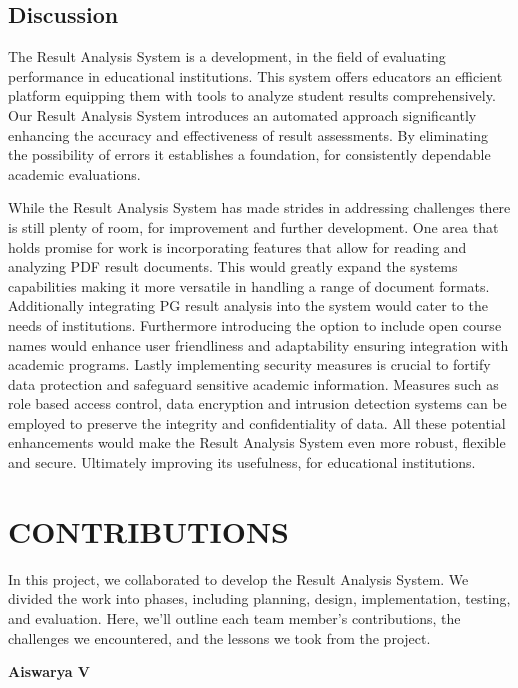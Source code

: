 \documentclass{nascproject}
\begin{document}
\section{Discussion}
The Result Analysis System is a development, in the field of evaluating performance in educational institutions. This system offers educators an efficient platform equipping them with tools to analyze student results comprehensively. Our Result Analysis System introduces an automated approach significantly enhancing the accuracy and effectiveness of result assessments. By eliminating the possibility of errors it establishes a foundation, for consistently dependable academic evaluations.

While the Result Analysis System has made strides in addressing challenges there is still plenty of room, for improvement and further development. One area that holds promise for work is incorporating features that allow for reading and analyzing PDF result documents. This would greatly expand the systems capabilities making it more versatile in handling a range of document formats. Additionally integrating PG result analysis into the system would cater to the needs of institutions. Furthermore introducing the option to include open course names would enhance user friendliness and adaptability ensuring integration with academic programs. Lastly implementing security measures is crucial to fortify data protection and safeguard sensitive academic information. Measures such as role based access control, data encryption and intrusion detection systems can be employed to preserve the integrity and confidentiality of data. All these potential enhancements would make the Result Analysis System even more robust, flexible and secure. Ultimately improving its usefulness, for educational institutions.



\chapter{CONTRIBUTIONS}
	In this project, we collaborated to develop the Result Analysis System. We divided the work into phases, including planning, design, implementation, testing, and evaluation. Here, we'll outline each team member's contributions, the challenges we encountered, and the lessons we took from the project.
	
	
	\textbf{Aiswarya V}
	
\end{document}
